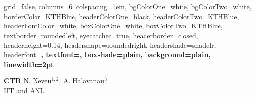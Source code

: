 \documentclass[landscape,final,a0paper,fontscale=0.277]{baposter}
\begin{document}
\begin{poster}{
	grid=false,
	columns=6,
	colspacing=1em,
	bgColorOne=white,
	bgColorTwo=white,
	borderColor=KTHBlue,
	headerColorOne=black,
	headerColorTwo=KTHBlue,
	headerFontColor=white,
	boxColorOne=white,
	boxColorTwo=KTHBlue,
	textborder=roundedleft,
	eyecatcher=true,
	headerborder=closed,
	headerheight=0.14\textheight,
	headershape=roundedright,
	headershade=shadelr,
	headerfont=\Large\bf\textsc, %
	textfont={\setlength{\parindent}{0em}},
	boxshade=plain,
	background=plain,
	linewidth=2pt
}
{
	
	\makebox[12em][l]{
} }
{\bf\textsc{CTR }}%
{%
	N. Neveu$^{1,2}$, A. Halavanau$^3$ \\
	IIT and ANL \\
    }
{%
		\makebox[12em][r]{%
			\hfill
}

}





\end{poster}
\end{document}
